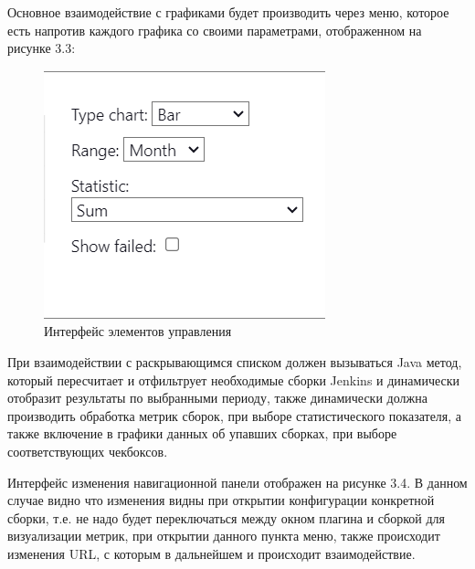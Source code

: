 Основное взаимодействие с графиками будет производить через меню, которое есть напротив каждого графика со своими параметрами, отображенном на рисунке 3.3:

\begin{figure}[ht!] 
	\center
	\includegraphics [scale=0.47] {my_folder/images//ui13}
	\caption{Интерфейс элементов управления} 
	\label{fig:ui13}  
\end{figure}

При взаимодействии с раскрывающимся списком должен вызываться Java метод, который пересчитает и отфильтрует необходимые сборки Jenkins и динамически отобразит результаты по выбранными периоду, также динамически должна производить обработка метрик сборок, при выборе статистического показателя, а также включение в графики данных об упавших сборках, при выборе соответствующих чекбоксов.

Интерфейс изменения навигационной панели отображен на рисунке 3.4. В данном случае видно что изменения видны при открытии конфигурации конкретной сборки, т.е. не надо будет переключаться между окном плагина и сборкой для визуализации метрик, при открытии данного пункта меню, также происходит изменения URL, с которым в дальнейшем и происходит взаимодействие.

